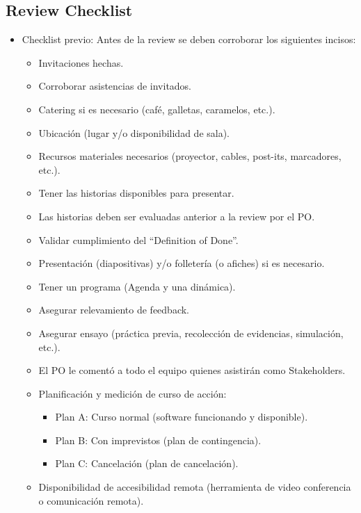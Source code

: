 \subsection{Review Checklist}

\begin{itemize}
  
  \item {Checklist previo: Antes de la review se deben corroborar los siguientes incisos:
  
  \begin{itemize}
    \item Invitaciones hechas.
    \item Corroborar asistencias de invitados.
    \item Catering si es necesario (café, galletas, caramelos, etc.).
    \item Ubicación (lugar y/o disponibilidad de sala).
    \item Recursos materiales necesarios (proyector, cables, post-its, marcadores, etc.).
    \item Tener las historias disponibles para presentar.
    \item Las historias deben ser evaluadas anterior a la review por el PO.
    \item Validar cumplimiento del “Definition of Done”.
    \item Presentación (diapositivas) y/o folletería (o afiches) si es necesario.
    \item Tener un programa (Agenda y una dinámica).
    \item Asegurar relevamiento de feedback.
    \item Asegurar ensayo (práctica previa, recolección de evidencias, simulación, etc.).
    \item El PO le comentó a todo el equipo quienes asistirán como Stakeholders.
    \item {Planificación y medición de curso de acción:
      \begin{itemize}
        \item Plan A: Curso normal (software funcionando y disponible).
        \item Plan B: Con imprevistos (plan de contingencia).
        \item Plan C: Cancelación (plan de cancelación).
      \end{itemize}
      }
    \item Disponibilidad de accesibilidad remota (herramienta de video conferencia o comunicación remota).    
      

\end{itemize}}
\end{itemize}
